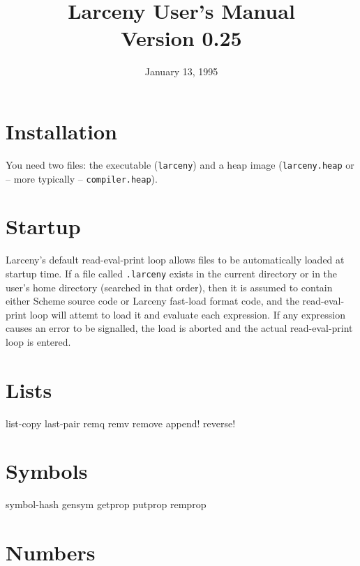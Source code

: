 
\newcommand{\reg}[1]{{\sc \%#1}}

\topmargin      -2.0cm
\oddsidemargin   0.0cm
\evensidemargin  0.0cm
\textwidth      6.5in
\textheight     9.5in

\newcommand{\proc}[2]{\noindent \code{(#1 {\em #2})} \hfill {\em procedure} \\}
\newcommand{\arg}[1]{{\em #1}}
\newcommand{\code}[1]{{\tt #1}}

\title{Larceny User's Manual \\ {\large Version 0.25}}
\author{}
\date{January 13, 1995}



\section{Installation}

You need two files: the executable (\code{larceny}) and a heap image
(\code{larceny.heap} or -- more typically -- \code{compiler.heap}).

\section{Startup}

Larceny's default read-eval-print loop allows files to be automatically
loaded at startup time.  If a file called \code{.larceny} exists in the
current directory or in the user's home directory (searched in that
order), then it is assumed to contain either Scheme source code or
Larceny fast-load format code, and the read-eval-print loop will attemt
to load it and evaluate each expression.  If any expression causes an
error to be signalled, the load is aborted and the actual
read-eval-print loop is entered.

\section{Lists}

list-copy
last-pair
remq
remv
remove
append!
reverse!

\section{Symbols}

symbol-hash
gensym
getprop
putprop
remprop

\section{Numbers}

